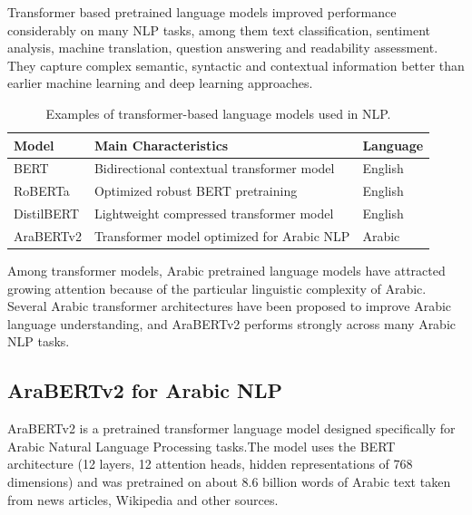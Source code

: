 \documentclass[12pt]{report}
\begin{document}
Transformer based pretrained language models improved performance considerably on many NLP tasks, among them text classification, sentiment analysis, machine translation, question answering and readability assessment. They capture complex semantic, syntactic and contextual information better than earlier machine learning and deep learning approaches.
\begin{table}[H]

\centering

\caption{Examples of transformer-based language models used in NLP.}

\label{tab:transformer_models}

\begin{tabular}{p{4cm} p{6.5cm} p{2.5cm}}

\toprule

\textbf{Model} & \textbf{Main Characteristics} & \textbf{Language} \\

\midrule

BERT & Bidirectional contextual transformer model & English \\

RoBERTa & Optimized robust BERT pretraining & English \\

DistilBERT & Lightweight compressed transformer model & English \\

AraBERTv2 & Transformer model optimized for Arabic NLP & Arabic \\

\bottomrule

\end{tabular}

\end{table}
Among transformer models, Arabic pretrained language models have attracted growing attention because of the particular linguistic complexity of Arabic. Several Arabic transformer architectures have been proposed to improve Arabic language understanding, and AraBERTv2 performs strongly across many Arabic NLP tasks.

\subsection{AraBERTv2 for Arabic NLP}

AraBERTv2 is a pretrained transformer language model designed specifically for Arabic Natural Language Processing tasks\cite{antoun2020arabert}.The model uses the BERT architecture (12 layers, 12 attention heads, hidden representations of 768 dimensions) and was pretrained on about 8.6 billion words of Arabic text taken from news articles, Wikipedia and other sources.
\end{document}
